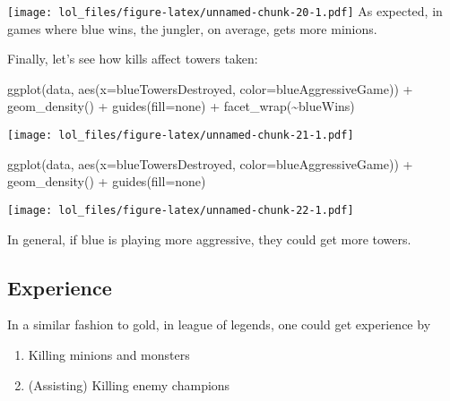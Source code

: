 \documentclass[
]{article}
\newenvironment{Shaded}{\begin{snugshade}}{\end{snugshade}}
\newcommand{\AttributeTok}[1]{\textcolor[rgb]{0.77,0.63,0.00}{#1}}
\newcommand{\FunctionTok}[1]{\textcolor[rgb]{0.00,0.00,0.00}{#1}}
\newcommand{\NormalTok}[1]{#1}
\newcommand{\SpecialCharTok}[1]{\textcolor[rgb]{0.00,0.00,0.00}{#1}}
\newcommand{\StringTok}[1]{\textcolor[rgb]{0.31,0.60,0.02}{#1}}
\begin{document}
\texttt{[image: lol\_files/figure-latex/unnamed-chunk-20-1.pdf]} As
expected, in games where blue wins, the jungler, on average, gets more
minions.

Finally, let's see how kills affect towers taken:

\begin{Shaded}
\begin{Highlighting}[]
\FunctionTok{ggplot}\NormalTok{(data, }\FunctionTok{aes}\NormalTok{(}\AttributeTok{x=}\NormalTok{blueTowersDestroyed, }\AttributeTok{color=}\NormalTok{blueAggressiveGame)) }\SpecialCharTok{+} 
  \FunctionTok{geom\_density}\NormalTok{()  }\SpecialCharTok{+}
  \FunctionTok{guides}\NormalTok{(}\AttributeTok{fill=}\StringTok{\textquotesingle{}none\textquotesingle{}}\NormalTok{) }\SpecialCharTok{+} 
  \FunctionTok{facet\_wrap}\NormalTok{(}\SpecialCharTok{\textasciitilde{}}\NormalTok{blueWins)}
\end{Highlighting}
\end{Shaded}

\texttt{[image: lol\_files/figure-latex/unnamed-chunk-21-1.pdf]}

\begin{Shaded}
\begin{Highlighting}[]
\FunctionTok{ggplot}\NormalTok{(data, }\FunctionTok{aes}\NormalTok{(}\AttributeTok{x=}\NormalTok{blueTowersDestroyed, }\AttributeTok{color=}\NormalTok{blueAggressiveGame)) }\SpecialCharTok{+} 
  \FunctionTok{geom\_density}\NormalTok{()  }\SpecialCharTok{+}
  \FunctionTok{guides}\NormalTok{(}\AttributeTok{fill=}\StringTok{\textquotesingle{}none\textquotesingle{}}\NormalTok{)}
\end{Highlighting}
\end{Shaded}

\texttt{[image: lol\_files/figure-latex/unnamed-chunk-22-1.pdf]}

In general, if blue is playing more aggressive, they could get more
towers.

\hypertarget{experience}{%
\subsection{Experience}\label{experience}}

In a similar fashion to gold, in league of legends, one could get
experience by

\begin{enumerate}
\def\labelenumi{\arabic{enumi}.}
\item
  Killing minions and monsters
\item
  (Assisting) Killing enemy champions
\end{enumerate}
\end{document}
